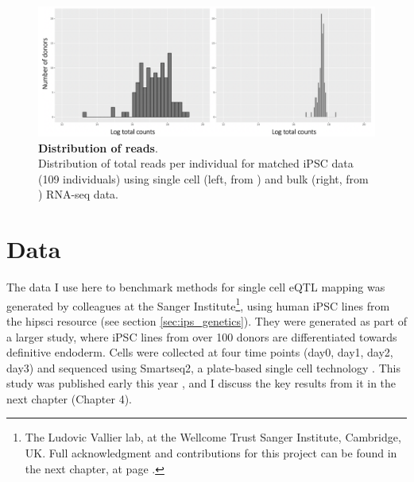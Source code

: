\begin{figure}[h]
\centering
\includegraphics[width=13cm]{Chapter3/Fig/count_distribution_sc_vs_bulk.png}
\caption[Distribution of reads]{\textbf{Distribution of reads}.\\
Distribution of total reads per individual for matched iPSC data (109 individuals) using single cell (left, from \cite{cuomo2020single}) and bulk (right, from \cite{mirauta2018population}) RNA-seq data.}
\label{fig:sc_bulk_counts}
\end{figure}


\newpage

\section{Data}

The data I use here to benchmark methods for single cell eQTL mapping was generated by colleagues at the Sanger Institute\footnote{The Ludovic Vallier lab, at the Wellcome Trust Sanger Institute, Cambridge, UK.
Full acknowledgment and contributions for this project can be found in the next chapter, at page \pageref{contr:chapter4}.}, using human iPSC lines from the \gls{hipsci} resource (see section \ref{sec:ips_genetics}). 
They were generated as part of a larger study, where iPSC lines from over 100 donors are differentiated towards definitive endoderm.
Cells were collected at four time points (day0, day1, day2, day3) and sequenced using Smartseq2, a plate-based single cell technology \cite{picelli2013smart}.
This study was published early this year \cite{cuomo2020single}, and I discuss the key results from it in the next chapter (Chapter 4).\\

